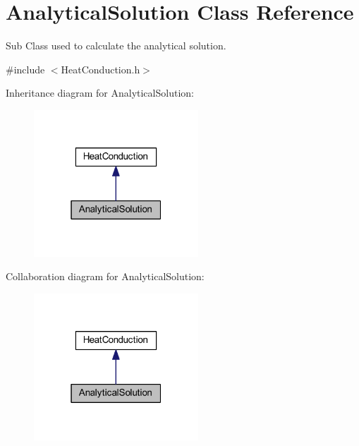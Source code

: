 \hypertarget{class_analytical_solution}{}\section{Analytical\+Solution Class Reference}
\label{class_analytical_solution}


Sub Class used to calculate the analytical solution.  




{\ttfamily \#include $<$Heat\+Conduction.\+h$>$}



Inheritance diagram for Analytical\+Solution\+:\nopagebreak
\begin{figure}[H]
\begin{center}
\leavevmode
\includegraphics[width=175pt]{class_analytical_solution__inherit__graph}
\end{center}
\end{figure}


Collaboration diagram for Analytical\+Solution\+:\nopagebreak
\begin{figure}[H]
\begin{center}
\leavevmode
\includegraphics[width=175pt]{class_analytical_solution__coll__graph}
\end{center}
\end{figure}
